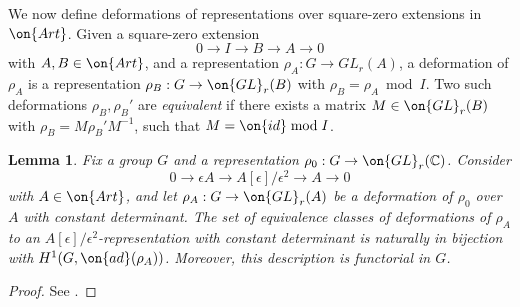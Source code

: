 \documentclass[12 pt]{amsart}
\theoremstyle{plain}
\newtheorem{lemma}[subsubsection]{Lemma}
\theoremstyle{definition}
\theoremstyle{remark}
\numberwithin{equation}{section}
\begin{document}
We now define deformations of representations over square-zero extensions in
$\on{Art}$.
  Given a square-zero extension $$0\to I\to B\to A\to 0$$ with $A, B\in\on{Art}$, and a representation $\rho_A: G\to GL_r(A)$, a deformation of $\rho_A$ is a representation $\rho_B: G\to \on{GL}_r(B)$ with $\rho_B=\rho_A\bmod I$. Two such deformations $\rho_B, \rho_B'$ are \emph{equivalent} if there exists a matrix $M\in \on{GL}_r(B)$ with $\rho_B=M\rho_B'M^{-1}$, such that $M=\on{id}\bmod I$. 
  \begin{lemma}
	\label{lemma:tangent-space}
	Fix a group $G$ and a representation $\rho_0 : G \to \on{GL}_r(\mathbb C)$. Consider $$0\to \epsilon A\to A[\epsilon]/\epsilon^2\to A\to 0$$ with $A\in\on{Art}$, and let $\rho_A: G\to \on{GL}_r(A)$ be a deformation of $\rho_0$ over $A$ with constant determinant.
	The set of equivalence classes of deformations of $\rho_A$ to an $A[\epsilon]/\epsilon^2$-representation with constant determinant is naturally in bijection with $H^1(G, \on{ad}(\rho_A))$.
	Moreover, this description is functorial in $G$.
\end{lemma}
\begin{proof}
See \cite[Chapter V, \S21, Proposition 1]{mazur1997introduction}.
\end{proof}
\end{document}
